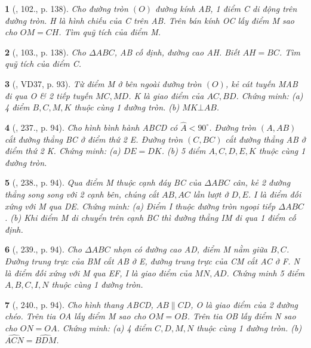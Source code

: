 \documentclass{article}
\newtheorem{baitoan}{}
\begin{document}
\begin{baitoan}[\cite{Tuyen_Toan_9_old}, 102., p. 138]
	Cho đường tròn $(O)$ đường kính AB, 1 điểm C di động trên đường tròn. H là hình chiếu của C trên AB. Trên bán kính OC lấy điểm M sao cho $OM = CH$. Tìm quỹ tích của điểm M.
\end{baitoan}

\begin{baitoan}[\cite{Tuyen_Toan_9_old}, 103., p. 138]
	Cho $\Delta ABC$, AB cố định, đường cao AH. Biết $AH = BC$. Tìm quỹ tích của điểm C.
\end{baitoan}

\begin{baitoan}[\cite{Binh_Toan_9_tap_2}, VD37, p. 93]
	Từ điểm M ở bên ngoài đường tròn $(O)$, kẻ cát tuyến MAB đi qua O \& 2 tiếp tuyến $MC,MD$. K là giao điểm của $AC,BD$. Chứng minh: (a) 4 điểm $B,C,M,K$ thuộc cùng 1 đường tròn. (b) $MK\bot AB$.
\end{baitoan}

\begin{baitoan}[\cite{Binh_Toan_9_tap_2}, 237., p. 94]
	Cho hình bình hành ABCD có $\widehat{A} < 90^\circ$. Đường tròn $(A,AB)$ cắt đường thẳng BC ở điểm thứ 2 E. Đường tròn $(C,BC)$ cắt đường thẳng AB ở điểm thứ 2 K. Chứng minh: (a) $DE = DK$. (b) 5 điểm $A,C,D,E,K$ thuộc cùng 1 đường tròn.
\end{baitoan}

\begin{baitoan}[\cite{Binh_Toan_9_tap_2}, 238., p. 94]
	Qua điểm M thuộc cạnh đáy BC của $\Delta ABC$ cân, kẻ 2 đường thẳng song song với 2 cạnh bên, chúng cắt $AB,AC$ lần lượt ở $D,E$. I là điểm đối xứng với M qua DE. Chứng minh: (a) Điểm I thuộc đường tròn ngoại tiếp $\Delta ABC$. (b) Khi điểm M di chuyển trên cạnh BC thì đường thẳng IM đi qua 1 điểm cố định.
\end{baitoan}

\begin{baitoan}[\cite{Binh_Toan_9_tap_2}, 239., p. 94]
	Cho $\Delta ABC$ nhọn có đường cao AD, điểm M nằm giữa $B,C$. Đường trung trực của BM cắt AB ở E, đường trung trực của CM cắt AC ở F. N là điểm đối xứng với M qua EF, I là giao điểm của $MN,AD$. Chứng minh 5 điểm $A,B,C,I,N$ thuộc cùng 1 đường tròn.
\end{baitoan}

\begin{baitoan}[\cite{Binh_Toan_9_tap_2}, 240., p. 94]
	Cho hình thang ABCD, $AB\parallel CD$, O là giao điểm của 2 đường chéo. Trên tia OA lấy điểm M sao cho $OM = OB$. Trên tia OB lấy điểm N sao cho $ON = OA$. Chứng minh: (a) 4 điểm $C,D,M,N$ thuộc cùng 1 đường tròn. (b) $\widehat{ACN} = \widehat{BDM}$.
\end{baitoan}
\end{document}
